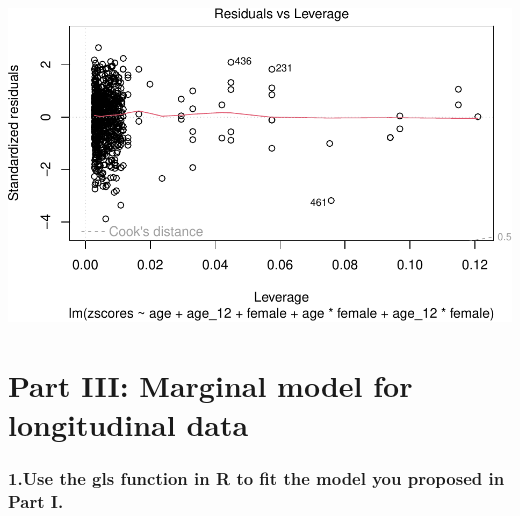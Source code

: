 \documentclass[
]{article}
\newenvironment{Shaded}{\begin{snugshade}}{\end{snugshade}}
\newcommand{\AttributeTok}[1]{\textcolor[rgb]{0.13,0.29,0.53}{#1}}
\newcommand{\CommentTok}[1]{\textcolor[rgb]{0.56,0.35,0.01}{\textit{#1}}}
\newcommand{\FunctionTok}[1]{\textcolor[rgb]{0.13,0.29,0.53}{\textbf{#1}}}
\newcommand{\NormalTok}[1]{#1}
\newcommand{\OtherTok}[1]{\textcolor[rgb]{0.56,0.35,0.01}{#1}}
\newcommand{\SpecialCharTok}[1]{\textcolor[rgb]{0.81,0.36,0.00}{\textbf{#1}}}
\begin{document}
\includegraphics{ProblemSet3_ts_1677791812_files/figure-latex/unnamed-chunk-17-4.pdf}

\hypertarget{part-iii-marginal-model-for-longitudinal-data}{%
\section{Part III: Marginal model for longitudinal
data}\label{part-iii-marginal-model-for-longitudinal-data}}

\hypertarget{use-the-gls-function-in-r-to-fit-the-model-you-proposed-in-part-i.}{%
\subsubsection{1.Use the gls function in R to fit the model you proposed
in Part
I.}\label{use-the-gls-function-in-r-to-fit-the-model-you-proposed-in-part-i.}}

\begin{Shaded}
\end{Shaded}
\end{document}
